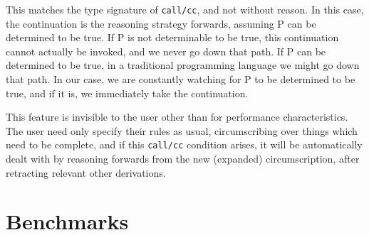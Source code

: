 This matches the type signature of \texttt{call/cc}, and not without reason.
In this case, the continuation is the reasoning strategy forwards, assuming P can be determined to be true.
If P is not determinable to be true, this continuation cannot actually be invoked, and we never go down that path.
If P can be determined to be true, in a traditional programming language we might go down that path.
In our case, we are constantly watching for P to be determined to be true, and if it is, we immediately take the continuation.

This feature is invisible to the user other than for performance characteristics.
The user need only specify their rules as usual, circumscribing over things which need to be complete, and if this \texttt{call/cc} condition arises, it will be automatically dealt with by reasoning forwards from the new (expanded) circumscription, after retracting relevant other derivations.



\section{Benchmarks}
